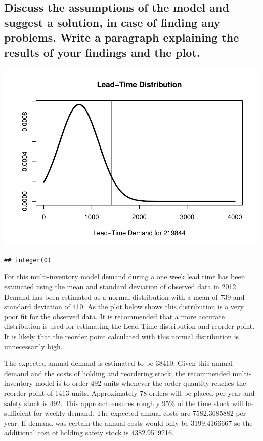 \documentclass[
  11pt,
]{article}
\begin{document}
\hypertarget{discuss-the-assumptions-of-the-model-and-suggest-a-solution-in-case-of-finding-any-problems.-write-a-paragraph-explaining-the-results-of-your-findings-and-the-plot.}{%
\subsection{Discuss the assumptions of the model and suggest a solution,
in case of finding any problems. Write a paragraph explaining the
results of your findings and the
plot.}\label{discuss-the-assumptions-of-the-model-and-suggest-a-solution-in-case-of-finding-any-problems.-write-a-paragraph-explaining-the-results-of-your-findings-and-the-plot.}}

\includegraphics{Assignment-STAT702_files/figure-latex/2bii-1.pdf}

\begin{verbatim}
## integer(0)
\end{verbatim}

For this multi-inventory model demand during a one week lead time has
been estimated using the mean and standard deviation of observed data in
2012. Demand has been estimated as a normal distribution with a mean of
739 and standard deviation of 410. As the plot below shows this
distribution is a very poor fit for the observed data. It is recommended
that a more accurate distribution is used for estimating the Lead-Time
distribution and reorder point. It is likely that the reorder point
calculated with this normal distribution is unnecessarily high.

The expected annual demand is estimated to be 38410. Given this annual
demand and the costs of holding and reordering stock, the recommended
multi-inventory model is to order 492 units whenever the order quantity
reaches the reorder point of 1413 units. Approximately 78 orders will be
placed per year and safety stock is 492. This approach ensures roughly
95\% of the time stock will be sufficient for weekly demand. The
expected annual costs are 7582.3685882 per year. If demand was certain
the annual costs would only be 3199.4166667 so the additional cost of
holding safety stock is 4382.9519216.
\end{document}
